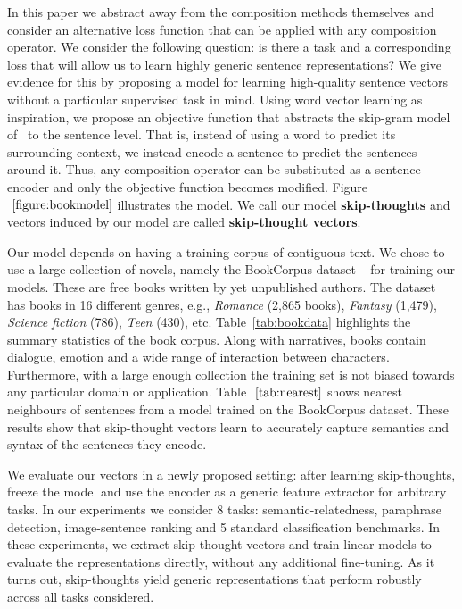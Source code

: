 \documentclass{article} \usepackage{nips15submit_e,times}
\begin{document}
In this paper we abstract away from the composition methods themselves and consider an alternative loss function that can be applied with any composition operator. We consider the following question: is there a task and a corresponding loss that will allow us to learn highly generic sentence representations? We give evidence for this by proposing a model for learning high-quality sentence vectors without a particular supervised task in mind. Using word vector learning as inspiration, we propose an objective function that abstracts the skip-gram model of~\cite{mikolov2013efficient} to the sentence level. That is, instead of using a word to predict its surrounding context, we instead encode a sentence to predict the sentences around it. Thus, any composition operator can be substituted as a sentence encoder and only the objective function becomes modified. Figure $~\ref{figure:bookmodel}$ illustrates the model. We call our model {\bf skip-thoughts} and vectors induced by our model are called {\bf skip-thought vectors}.

Our model depends on having a training corpus of contiguous text. We chose to use a large collection of novels, namely the BookCorpus dataset ~\cite{moviebook15} for training our models. These are free books written by yet unpublished authors. The dataset has books in 16 different genres, e.g., \emph{Romance} (2,865 books), \emph{Fantasy} (1,479), \emph{Science fiction} (786), \emph{Teen} (430), etc.  Table~\ref{tab:bookdata} highlights the summary statistics of the book corpus. Along with narratives, books contain dialogue, emotion and a wide range of interaction between characters. Furthermore, with a large enough collection the training set is not biased towards any particular domain or application. Table $~\ref{tab:nearest}$ shows nearest neighbours of sentences from a model trained on the BookCorpus dataset. These results show that skip-thought vectors learn to accurately capture semantics and syntax of the sentences they encode.

We evaluate our vectors in a newly proposed setting: after learning skip-thoughts, freeze the model and use the encoder as a generic feature extractor for arbitrary tasks. In our experiments we consider 8 tasks: semantic-relatedness, paraphrase detection, image-sentence ranking and 5 standard classification benchmarks. In these experiments, we extract skip-thought vectors and train linear models to evaluate the representations directly, without any additional fine-tuning. As it turns out, skip-thoughts yield generic representations that perform robustly across all tasks considered.
\end{document}
